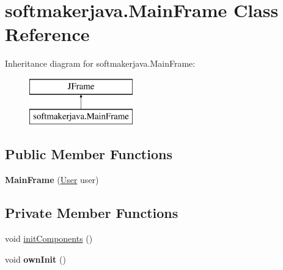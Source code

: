 \hypertarget{classsoftmakerjava_1_1_main_frame}{}\section{softmakerjava.\+Main\+Frame Class Reference}
\label{classsoftmakerjava_1_1_main_frame}
Inheritance diagram for softmakerjava.\+Main\+Frame\+:\begin{figure}[H]
\begin{center}
\leavevmode
\includegraphics[height=2.000000cm]{classsoftmakerjava_1_1_main_frame}
\end{center}
\end{figure}
\subsection*{Public Member Functions}
\begin{DoxyCompactItemize}
\item 
{\bfseries Main\+Frame} (\hyperlink{classsoftmakerjava_1_1_user}{User} user)\hypertarget{classsoftmakerjava_1_1_main_frame_a10aa668ac3039183b2a1865374aa0fcf}{}\label{classsoftmakerjava_1_1_main_frame_a10aa668ac3039183b2a1865374aa0fcf}

\end{DoxyCompactItemize}
\subsection*{Private Member Functions}
\begin{DoxyCompactItemize}
\item 
void \hyperlink{classsoftmakerjava_1_1_main_frame_a527cea1a1e0cc8bd5497aaf4ada1c50e}{init\+Components} ()
\item 
void {\bfseries own\+Init} ()\hypertarget{classsoftmakerjava_1_1_main_frame_aa62d2fe0f6ccdb8066c6b085eedcd52d}{}\label{classsoftmakerjava_1_1_main_frame_aa62d2fe0f6ccdb8066c6b085eedcd52d}

\end{DoxyCompactItemize}
